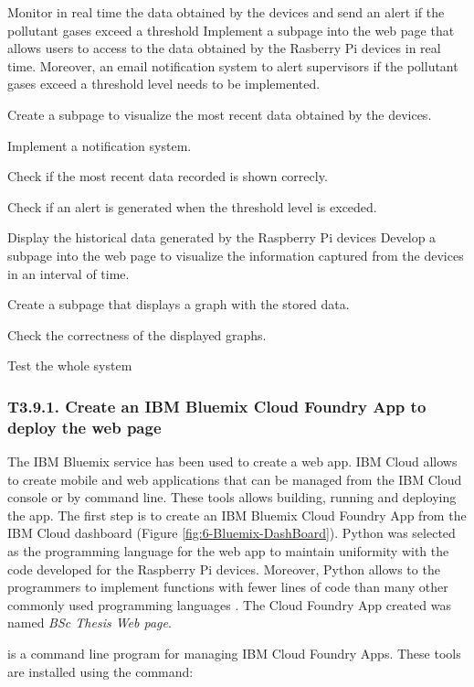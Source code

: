 {Monitor in real time the data obtained by the devices and send an alert if the pollutant gases exceed a threshold}
{Implement a subpage into the web page that allows users to access to the data obtained by the Rasberry Pi devices in real time. Moreover, an email notification system to alert supervisors if the pollutant gases exceed a threshold level needs to be implemented.}
{	\item Create a subpage to visualize the most recent data obtained by the devices.
	\item Implement a notification system.
}{	\item Check if the most recent data recorded is shown correcly.
	\item Check if an alert is generated when the threshold level is exceded.
}

{Display the historical data generated by the Raspberry Pi devices}
{Develop a subpage into the web page to visualize the information captured from the devices in an interval of time.}
{	\item Create a subpage that displays a graph with the stored data.
}{	\item Check the correctness of the displayed graphs.
	\item Test the whole system
}


\subsubsection{T3.9.1. Create an IBM Bluemix Cloud Foundry App to deploy the web page}
The IBM Bluemix service has been used to create a web app. IBM Cloud allows to create mobile and web applications that can be managed from the IBM Cloud console or by command line. These tools allows building, running and deploying the app. The first step is to create an IBM Bluemix Cloud Foundry App from the IBM Cloud dashboard (Figure \ref{fig:6-Bluemix-DashBoard}). Python was selected as the programming language for the web app to maintain uniformity with the code developed for the Raspberry Pi devices. Moreover, Python allows to the programmers to implement functions with fewer lines of code than many other commonly used programming languages \cite{Pre00}. The Cloud Foundry App created was named \textit{BSc Thesis Web page}.

 is a command line program for managing IBM Cloud Foundry Apps. These tools are installed using the command:

